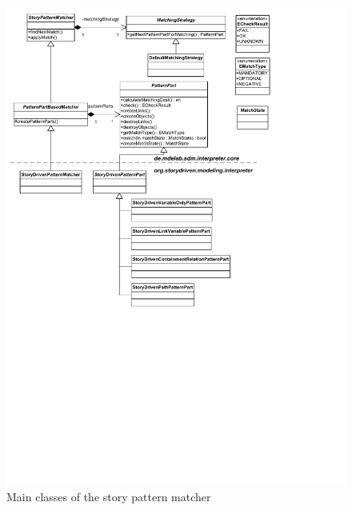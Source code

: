 \begin{figure}[htb]
  \centering
  \includegraphics[width=1.0\columnwidth]{./figures/interpreter_storyPatternMatcher.pdf}
  \caption{Main classes of the story pattern matcher}
  \label{fig:interpreter_storyPatternMatcher}
\end{figure}

